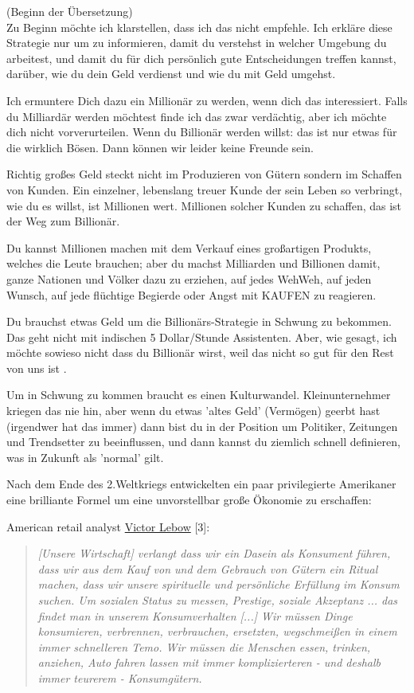 \documentclass[10pt,a4paper,ngerman,twoside]{article} %
\begin{document}
\begin{multicols}{3}
(Beginn der Übersetzung) \\


Zu Beginn möchte ich klarstellen, dass ich das nicht empfehle. Ich erkläre diese Strategie nur um zu informieren, damit du verstehst in welcher Umgebung du arbeitest, und damit du für dich persönlich gute Entscheidungen treffen kannst, darüber, wie du dein Geld verdienst und wie du mit Geld umgehst.

Ich ermuntere Dich dazu ein Millionär zu werden, wenn dich das interessiert. Falls du Milliardär werden möchtest finde ich das zwar verdächtig, aber ich möchte dich nicht vorverurteilen. Wenn du Billionär werden willst: das ist nur etwas für die wirklich Bösen. Dann können wir leider keine Freunde sein.

Richtig großes Geld steckt nicht im Produzieren von Gütern sondern im Schaffen von Kunden. Ein einzelner, lebenslang treuer Kunde der sein Leben so verbringt, wie du es willst, ist Millionen wert. Millionen solcher Kunden zu schaffen, das ist der Weg zum Billionär.

Du kannst Millionen machen mit dem Verkauf eines großartigen Produkts, welches die Leute brauchen; aber du machst Milliarden und Billionen damit, ganze Nationen und Völker dazu zu erziehen, auf jedes WehWeh, auf jeden Wunsch, auf jede flüchtige Begierde oder Angst mit KAUFEN zu reagieren.

Du brauchst etwas Geld um die Billionärs-Strategie in Schwung zu bekommen. Das geht nicht mit indischen 5 Dollar/Stunde Assistenten. Aber, wie gesagt, ich  möchte sowieso nicht dass du Billionär wirst, weil das nicht so gut für den Rest von uns ist .

Um in Schwung zu kommen braucht es einen Kulturwandel. Kleinunternehmer kriegen das nie hin, aber wenn du etwas 'altes Geld' (Vermögen) geerbt hast (irgendwer hat das immer) dann bist du in der Position um Politiker, Zeitungen und Trendsetter zu beeinflussen, und dann kannst du ziemlich schnell definieren, was in Zukunft als 'normal' gilt.

Nach dem Ende des 2.Weltkriegs entwickelten ein paar privilegierte Amerikaner eine brilliante Formel um eine unvorstellbar große Ökonomie zu erschaffen:


American retail analyst \href{https://en.wikipedia.org/wiki/Victor_Lebow}{Victor Lebow} [3]:
\begin{quote}
\textit{
[Unsere Wirtschaft] verlangt dass wir ein Dasein als Konsument führen, dass wir aus dem Kauf von und dem Gebrauch von Gütern ein Ritual machen, dass wir unsere spirituelle und persönliche Erfüllung im Konsum suchen. Um sozialen Status zu messen, Prestige, soziale Akzeptanz ... das findet man in unserem Konsumverhalten [...] Wir müssen Dinge konsumieren, verbrennen, verbrauchen, ersetzten, wegschmeißen in einem immer schnelleren Temo. Wir müssen die Menschen essen, trinken, anziehen, Auto fahren lassen mit immer komplizierteren - und deshalb immer teurerem -  Konsumgütern.}
\end{quote} 


\end{multicols}
\end{document}
